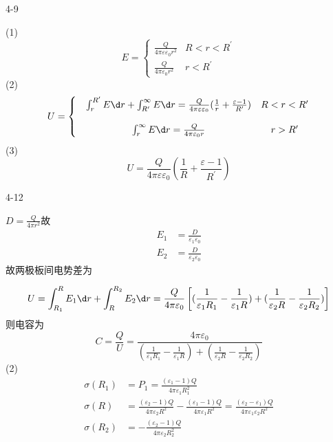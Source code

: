 \documentclass{phyasgn}
\begin{document}
{\heiti\color{red} 4-9}
\begin{sol}
(1)$$E=\left\{\begin{matrix}
    \frac{Q}{4\pi\varepsilon \varepsilon _0r^2} &R<r<R^{\prime} \\
   \frac{Q}{4\pi \varepsilon _0r^2}&r<R^{\prime}
  \end{matrix}\right.$$
(2)$$U=\left\{\begin{matrix}
    &\int_r^{R^{\prime }}E\d r+\int_{R^{\prime }}^\infty E\d r=\frac{Q}{4\pi\varepsilon \varepsilon _0}(\frac{1}{r}+\frac{\varepsilon -1}{R^{\prime }}  ) &R<r<R^{\prime} \\
  &\\
  &\int_{r}^\infty E\d r=\frac{Q}{4\pi\varepsilon _0r}&r>R^{\prime} 
  \end{matrix}\right.$$
(3)$$U=\frac{Q}{4\pi\varepsilon \varepsilon _0}(\frac{1}{R}+\frac{\varepsilon -1}{R^{\prime }}  ) $$
\end{sol}\par

{\heiti\color{red} 4-12}
\begin{sol}
$D=\frac{Q}{4\pi r^2}$故
$$\begin{aligned}
    E_1&=\frac{D}{\varepsilon_1\varepsilon_0}\\
    E_2&=\frac{D}{\varepsilon_2\varepsilon_0}
\end{aligned}$$
故两极板间电势差为

$$U=\int_{R_1}^RE_1\d r+\int_R^{R_2}E_2\d r=\frac{Q}{4\pi\varepsilon_0}\left [  (\frac{1}{\varepsilon_1R_1}-\frac{1}{\varepsilon_1R})+(\frac{1}{\varepsilon_2R}-\frac{1}{\varepsilon_2R_2})\right ] $$
则电容为
$$C=\frac{Q}{U}=\frac{4\pi\varepsilon_0}{(\frac{1}{\varepsilon_1R_1}-\frac{1}{\varepsilon_1R})+(\frac{1}{\varepsilon_2R}-\frac{1}{\varepsilon_2R_2})}$$
(2)$$\begin{aligned}
    \sigma(R_1)&=P_1=\frac{(\varepsilon_1-1)Q}{   4\pi\varepsilon_1R_1^2}\\
    \sigma(R)&=\frac{(\varepsilon_2-1)Q}{4\pi\varepsilon_2R^2}-\frac{(\varepsilon_1-1)Q}{4\pi\varepsilon_1R^2}=\frac{(\varepsilon_2-\varepsilon_1)Q}{4\pi\varepsilon_1\varepsilon_2R^2}\\
    \sigma(R_2)&=-\frac{(\varepsilon_2-1)Q}{4\pi\varepsilon_2R_2^2}
\end{aligned}$$
\end{sol}\newpage
\end{document}
